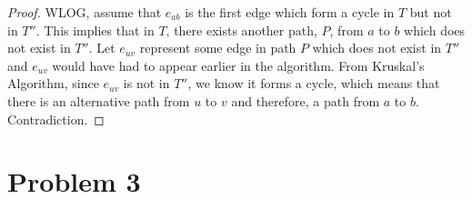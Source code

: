 \documentclass[12pt]{article}
\begin{document}
\begin{enumerate}
\begin{proof}
  WLOG, assume that $e_{ab}$ is the first edge which form a cycle in $T$ but not in $T''$. This implies that in $T$, there exists another path, $P$, from $a$ to $b$ which does not exist in $T''$. Let $e_{uv}$ represent some edge in path $P$ which does not exist in $T''$ and $e_{uv}$ would have had to appear earlier in the algorithm. From Kruskal's Algorithm, since $e_{uv}$ is not in $T''$, we know it forms a cycle, which means that there is an alternative path from $u$ to $v$ and therefore, a path from $a$ to $b$. Contradiction.

\end{proof}
\end{enumerate}

\section*{Problem 3}
\end{document}
